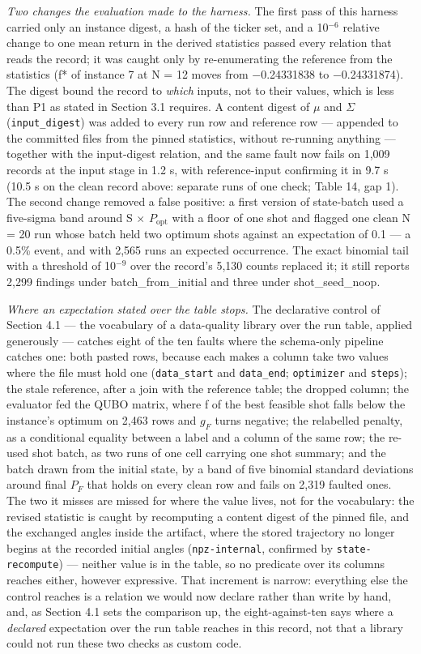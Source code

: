 \documentclass[acmsmall,screen,review]{acmart}
\begin{document}
\textit{Two changes the evaluation made to the harness.} The first pass of this harness carried only an instance digest, a hash of the ticker set, and a 10$^{-6}$ relative change to one mean return in the derived statistics passed every relation that reads the record; it was caught only by re-enumerating the reference from the statistics (f* of instance 7 at N = 12 moves from $-$0.24331838 to $-$0.24331874). The digest bound the record to \textit{which} inputs, not to their values, which is less than P1 as stated in Section 3.1 requires. A content digest of $\mu$ and $\Sigma$ (\texttt{input\_digest}) was added to every run row and reference row --- appended to the committed files from the pinned statistics, without re-running anything --- together with the input-digest relation, and the same fault now fails on 1,009 records at the input stage in 1.2 s, with reference-input confirming it in 9.7 s (10.5 s on the clean record above: separate runs of one check; Table 14, gap 1). The second change removed a false positive: a first version of state-batch used a five-sigma band around S $\times$ $P_{\mathrm{opt}}$ with a floor of one shot and flagged one clean N = 20 run whose batch held two optimum shots against an expectation of 0.1 --- a 0.5\% event, and with 2,565 runs an expected occurrence. The exact binomial tail with a threshold of 10$^{-9}$ over the record's 5,130 counts replaced it; it still reports 2,299 findings under batch\_from\_initial and three under shot\_seed\_noop.


\textit{Where an expectation stated over the table stops.} The declarative control of Section 4.1 --- the vocabulary of a data-quality library over the run table, applied generously --- catches eight of the ten faults where the schema-only pipeline catches one: both pasted rows, because each makes a column take two values where the file must hold one (\texttt{data\_start} and \texttt{data\_end}; \texttt{optimizer} and \texttt{steps}); the stale reference, after a join with the reference table; the dropped column; the evaluator fed the QUBO matrix, where f of the best feasible shot falls below the instance's optimum on 2,463 rows and $g_{F}$ turns negative; the relabelled penalty, as a conditional equality between a label and a column of the same row; the re-used shot batch, as two runs of one cell carrying one shot summary; and the batch drawn from the initial state, by a band of five binomial standard deviations around final $P_{F}$ that holds on every clean row and fails on 2,319 faulted ones. The two it misses are missed for where the value lives, not for the vocabulary: the revised statistic is caught by recomputing a content digest of the pinned file, and the exchanged angles inside the artifact, where the stored trajectory no longer begins at the recorded initial angles (\texttt{npz-internal}, confirmed by \texttt{state-recompute}) --- neither value is in the table, so no predicate over its columns reaches either, however expressive. That increment is narrow: everything else the control reaches is a relation we would now declare rather than write by hand, and, as Section 4.1 sets the comparison up, the eight-against-ten says where a \textit{declared} expectation over the run table reaches in this record, not that a library could not run these two checks as custom code.
\end{document}

